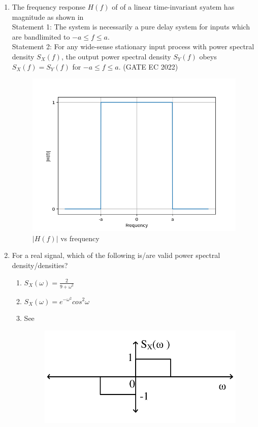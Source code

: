 \begin{enumerate}[label=\thechapter.\arabic*,ref=\thechapter.\theenumi]
\item The frequency response $H(f)$ of of a linear time-invariant syatem has magnitude as shown in \\
Statement 1: The system is necessarily a pure delay system for inputs which are bandlimited to $-a \leq f \leq a$.\\
Statement 2: For any wide-sense stationary input process with power spectral density $S_X(f)$, the output power spectral density $S_Y(f)$ obeys $S_X(f)=S_Y(f)$ for $-a \leq f \leq a$.
\hfill (GATE EC 2022)\\
\begin{figure}[!ht]
\centering
\includegraphics[width=\columnwidth]{gate/EC/2022/23/figs/figure.png}
\caption{$|H(f)|$ vs frequency}
\label{fig:23,2022}
\end{figure}

\item For a real signal, which of the following is/are valid power spectral density/densities?
\begin{enumerate}
\item \label{eq:30/2023/1}$S_X(\omega)=\frac{2}{9+\omega^2}$\\
\item \label{eq:30/2023/2}$S_X(\omega)=e^{-\omega^2}cos^2{\omega}$
\item See 
\begin{figure}[ht]
	\centering
	\includegraphics[width=\columnwidth]{gate/EC/2022/30/figs/fig1.png}

\end{figure}
\end{enumerate}
\end{enumerate}
